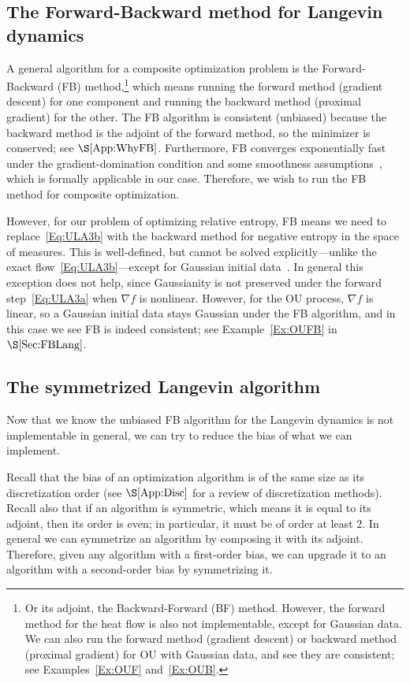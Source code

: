 \documentclass[final,12pt]{colt2018}
\begin{document}
\subsection{The Forward-Backward method for Langevin dynamics}

A general algorithm for a composite optimization problem is the Forward-Backward (FB) method,\footnote{Or its adjoint, the Backward-Forward (BF) method.
However, the forward method for the heat flow is also not implementable, except for Gaussian data. 
We can also run the forward method (gradient descent) or backward method (proximal gradient) for OU with Gaussian data, and see they are consistent; 
see Examples~\ref{Ex:OUF} and~\ref{Ex:OUB}.}
which means running the forward method (gradient descent) for one component and running the backward method (proximal gradient) for the other.
The FB algorithm is consistent (unbiased) because the backward method is the adjoint of the forward method, so the minimizer is conserved; see $\S\ref{App:WhyFB}$.
Furthermore, FB converges exponentially fast under the gradient-domination condition and some smoothness assumptions~\cite[]{GRV17}, which is formally applicable in our case.
Therefore, we wish to run the FB method for composite optimization.

However, for our problem of optimizing relative entropy, FB means we need to replace~\eqref{Eq:ULA3b} with the backward method for negative entropy in the space of measures.
This is well-defined, but cannot be solved explicitly---unlike the exact flow~\eqref{Eq:ULA3b}---except for Gaussian initial data~\cite[]{CG03}.
In general this exception does not help, since Gaussianity is not preserved under the forward step~\eqref{Eq:ULA3a} when $\nabla f$ is nonlinear.
However, for the OU process, $\nabla f$ is linear, so a Gaussian initial data stays Gaussian under the FB algorithm, and in this case we see FB is indeed consistent; see Example~\ref{Ex:OUFB} in~$\S\ref{Sec:FBLang}$.


\subsection{The symmetrized Langevin algorithm}


Now that we know the unbiased FB algorithm for the Langevin dynamics is not implementable in general, we can try to reduce the bias of what we can implement.

Recall that the bias of an optimization algorithm is of the same size as its discretization order
(see $\S\ref{App:Disc}$ for a review of discretization methods).
Recall also that if an algorithm is symmetric, which means it is equal to its adjoint, then its order is even; in particular, it must be of order at least $2$.
In general we can symmetrize an algorithm by composing it with its adjoint. 
Therefore, given any algorithm with a first-order bias, we can upgrade it to an algorithm with a second-order bias by symmetrizing it.
\end{document}
